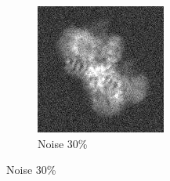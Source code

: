 \documentclass[twoside]{iitbreport}
\begin{document}
\begin{figure}[h]
\begin{subfigure}{.28\textwidth}
\centering
\includegraphics[width=0.8\linewidth]{Emd_4138_proj1_noise_30.jpg}
\captionsetup{justification=centering}
\caption{ Noise 30\%}
\end{subfigure}


\end{figure}
\end{document}
